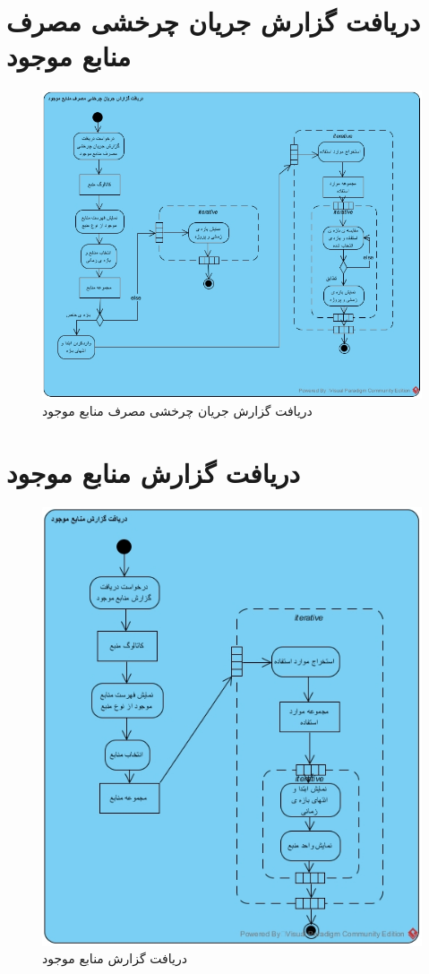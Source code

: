 \section{دریافت گزارش جریان چرخشی مصرف منابع موجود}
\begin{figure}[H]
	\centering
	\includegraphics[scale=0.6]{img/activity/repflow}
	\caption{دریافت گزارش جریان چرخشی مصرف منابع موجود}
\end{figure}

\section{دریافت گزارش منابع موجود}
\begin{figure}[H]
	\centering
	\includegraphics[scale=0.8]{img/activity/repavail}
	\caption{دریافت گزارش منابع موجود}
\end{figure}


